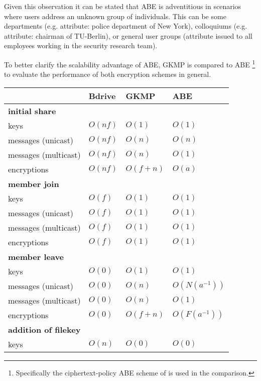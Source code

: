 Given this observation it can be stated that \ac{ABE} is adventitious in scenarios where users address an unknown group of individuals. This can be some departments (e.g. attribute: police department of New York), colloquiums (e.g. attribute: chairman of TU-Berlin), or general user groups (attribute issued to all employees working in the security research team).

To better clarify the scalability advantage of \ac{ABE}, GKMP is compared to ABE \footnote{Specifically the ciphertext-policy ABE scheme of \cite{bethencourt2007ciphertext} is used in the comparison.} to evaluate the performance of both encryption schemes in general.

\begin{table*}[!ht]
\centering
\begin{tabular}{l 		| l 						| l 						| l }
 						& \textbf{Bdrive}			& \textbf{\ac{GKMP}} 			& \textbf{\ac{ABE}} 		\\
\hline
\textbf{initial share} 																				\\
keys 					& $O(nf)$ 					& $O(1)$	 				& $O(1)$			\\
messages (unicast)		& $O(nf)$  					& $O(n)$					& $O(n)$			\\
messages (multicast) 	& $O(nf)$ 					& $O(n)$ 					& $O(1)$			\\
encryptions				& $O(nf)$ 					& $O(f + n)$				& $O(a)$ 			\\
\hline
\textbf{member join} 																				\\
keys 					& $O(f)$   					& $O(1)$					& $O(1)$			\\
messages (unicast)		& $O(f)$  					& $O(1)$  					& $O(1)$ 			\\
messages (multicast) 	& $O(f)$ 	 				& $O(1)$					& $O(1)$ 			\\
encryptions				& $O(f)$  					& $O(1)$					& $O(1)$ 			\\
\hline
\textbf{member leave}																				\\
keys 					& $O(0)$					& $O(1)$					& $O(1)$			\\
messages (unicast)		& $O(0)$					& $O(n)$  					& $O(N(a^{-1}))$	\\
messages (multicast)	& $O(0)$					& $O(n)$					& $O(1)$ 			\\ 
encryptions 			& $O(0)$					& $O(f + n)$ 				& $O(F(a^{-1}))$	\\
\hline	
\textbf{addition of filekey}																		\\
keys 					& $O(n)$	 				& $O(0)$					& $O(0)$			\\

\end{tabular}
\end{table*}
